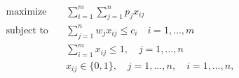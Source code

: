 \begin{align*}
\text{maximize} \quad & \sum_{i=1}^m \sum_{j=1}^n p_j x_{ij} \\
\text{subject to} \quad & \sum_{j=1}^n w_j x_{ij} \leq c_i \quad i = 1, \ldots, m \\
& \sum_{i=1}^m x_{ij} \leq 1, \quad j = 1, \ldots, n \\
& x_{ij} \in \lbrace 0, 1 \rbrace, \quad j = 1, \ldots,n, \quad i = 1, \ldots, n,
\end{align*}


